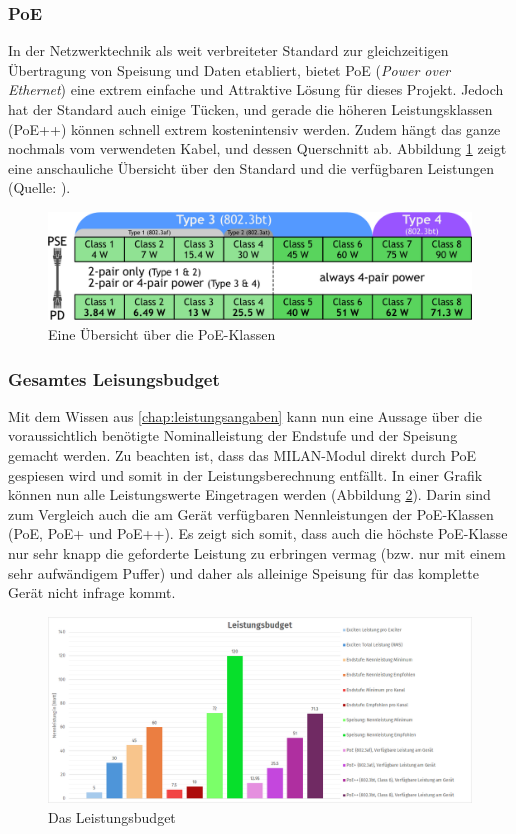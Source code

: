 \subsubsection{PoE}
In der Netzwerktechnik als weit verbreiteter Standard zur gleichzeitigen Übertragung von Speisung und Daten etabliert, bietet PoE (\textit{Power over Ethernet}) eine extrem einfache und Attraktive Lösung für dieses Projekt. Jedoch hat der Standard auch einige Tücken, und gerade die höheren Leistungsklassen (PoE++) können schnell extrem kostenintensiv werden. Zudem hängt das ganze nochmals vom verwendeten Kabel, und dessen Querschnitt ab. Abbildung \ref{pic:poe_overview} zeigt eine anschauliche Übersicht über den Standard und die verfügbaren Leistungen (Quelle: \cite{PoE_overview_doc}).
\begin{figure}[H]
	\centering
	\includegraphics[width=\textwidth*3/4]{pictures/PoE_overview.png}
	\caption{Eine Übersicht über die PoE-Klassen}
	\label{pic:poe_overview}
\end{figure}
\subsubsection{Gesamtes Leisungsbudget}
Mit dem Wissen aus \ref{chap:leistungsangaben} kann nun eine Aussage über die voraussichtlich benötigte Nominalleistung der Endstufe und der Speisung gemacht werden. {\color{red} Zu beachten ist, dass das MILAN-Modul direkt durch PoE gespiesen wird und somit in der Leistungsberechnung entfällt.} In einer Grafik können nun alle Leistungswerte Eingetragen werden (Abbildung \ref{pic:Leistungsbudget}). Darin sind zum Vergleich auch die am Gerät verfügbaren Nennleistungen der PoE-Klassen (PoE, PoE+ und PoE++). Es zeigt sich somit, dass auch die höchste PoE-Klasse nur sehr knapp die geforderte Leistung zu erbringen vermag (bzw. nur mit einem sehr aufwändigem Puffer) und daher als alleinige Speisung für das komplette Gerät nicht infrage kommt.
\begin{figure}[H]
	\centering
	\includegraphics[width=\textwidth]{pictures/Leistungsbudget.png}
	\caption{Das Leistungsbudget}
	\label{pic:Leistungsbudget}
\end{figure}
